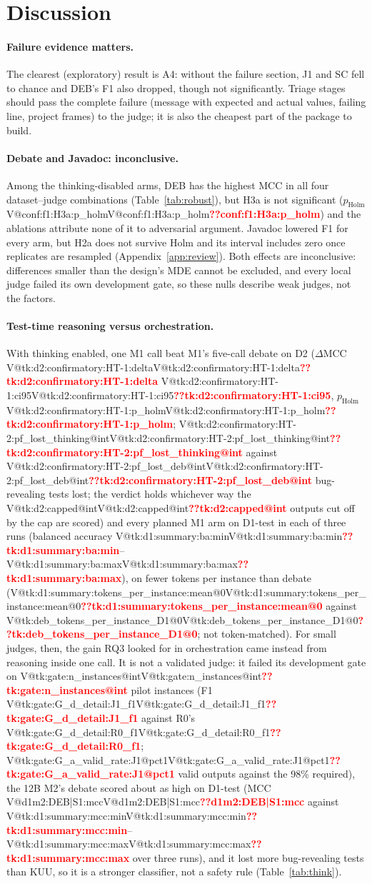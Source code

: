 \documentclass[pdflatex,iicol,sn-mathphys-num]{sn-jnl}
\makeatletter
\newcommand{\V}[1]{\ifcsname V@#1\endcsname\csname V@#1\endcsname\else\textbf{\textcolor{red}{??#1}}\fi}
\makeatother
\begin{document}
\section{Discussion}\label{sec:discussion}

\paragraph{Failure evidence matters.} The clearest (exploratory) result is A4: without the failure section, J1 and SC fell to chance and DEB's F1 also dropped, though not significantly. Triage stages should pass the complete failure (message with expected and actual values, failing line, project frames) to the judge; it is also the cheapest part of the package to build.

\paragraph{Debate and Javadoc: inconclusive.} Among the thinking-disabled arms, DEB has the highest MCC in all four dataset--judge combinations (Table~\ref{tab:robust}), but H3a is not significant ($p_\mathrm{Holm}$ \V{conf:f1:H3a:p_holm}) and the ablations attribute none of it to adversarial argument. Javadoc lowered F1 for every arm, but H2a does not survive Holm and its interval includes zero once replicates are resampled (Appendix~\ref{app:review}). Both effects are inconclusive: differences smaller than the design's MDE cannot be excluded, and every local judge failed its own development gate, so these nulls describe weak judges, not the factors.

\paragraph{Test-time reasoning versus orchestration.} With thinking enabled, one M1 call beat M1's five-call debate on D2 ($\Delta$MCC \V{tk:d2:confirmatory:HT-1:delta} \V{tk:d2:confirmatory:HT-1:ci95}, $p_\mathrm{Holm}$ \V{tk:d2:confirmatory:HT-1:p_holm}; \V{tk:d2:confirmatory:HT-2:pf_lost_thinking@int} against \V{tk:d2:confirmatory:HT-2:pf_lost_deb@int} bug-revealing tests lost; the verdict holds whichever way the \V{tk:d2:capped@int} outputs cut off by the cap are scored) and every planned M1 arm on D1-test in each of three runs (balanced accuracy \V{tk:d1:summary:ba:min}--\V{tk:d1:summary:ba:max}), on fewer tokens per instance than debate (\V{tk:d1:summary:tokens_per_instance:mean@0} against \V{tk:deb_tokens_per_instance_D1@0}; not token-matched). For small judges, then, the gain RQ3 looked for in orchestration came instead from reasoning inside one call. It is not a validated judge: it failed its development gate on \V{tk:gate:n_instances@int} pilot instances (F1 \V{tk:gate:G_d_detail:J1_f1} against R0's \V{tk:gate:G_d_detail:R0_f1}; \V{tk:gate:G_a_valid_rate:J1@pct1} valid outputs against the 98\% required), the 12B M2's debate scored about as high on D1-test (MCC \V{d1m2:DEB|S1:mcc} against \V{tk:d1:summary:mcc:min}--\V{tk:d1:summary:mcc:max} over three runs), and it lost more bug-revealing tests than KUU, so it is a stronger classifier, not a safety rule (Table~\ref{tab:think}).
\end{document}

